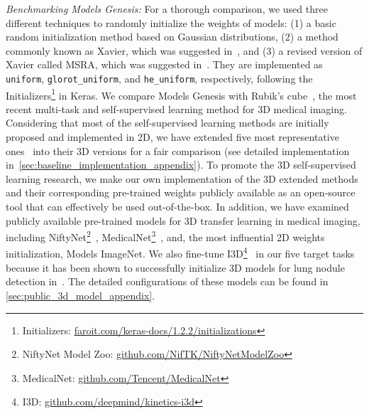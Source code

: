 \textit{Benchmarking Models Genesis:} For a thorough comparison, we used three different techniques to randomly initialize the weights of models: (1) a basic random initialization method based on Gaussian distributions, (2) a method commonly known as Xavier, which was suggested in~\citet{glorot2010understanding}, and (3) a revised version of Xavier called MSRA, which was suggested in~\citet{he2015delving}. They are implemented as \texttt{uniform}, \texttt{glorot\_uniform}, and \texttt{he\_uniform}, respectively, following the Initializers\footnote{\label{foot:Initializer}Initializers: \href{http://faroit.com/keras-docs/1.2.2/initializations/}{faroit.com/keras-docs/1.2.2/initializations}} in Keras. We compare Models Genesis with Rubik's cube~\citep{zhuang2019self}, the most recent multi-task and self-supervised learning method for 3D medical imaging. Considering that most of the self-supervised learning methods are initially proposed and implemented in 2D, we have extended five most representative ones~\citep{vincent2010stacked,pathak2016context,noroozi2016unsupervised,chen2019self,caron2018deep} into their 3D versions for a fair comparison (see detailed implementation in~\ref{sec:baseline_implementation_appendix}). To promote the 3D self-supervised learning research, we make our own implementation of the 3D extended methods and their corresponding pre-trained weights publicly available as an open-source tool that can effectively be used out-of-the-box. In addition, we have examined publicly available pre-trained models for 3D transfer learning in medical imaging, including NiftyNet\footnote{\label{foot:NiftyNet}NiftyNet Model Zoo: \href{https://github.com/NifTK/NiftyNetModelZoo}{github.com/NifTK/NiftyNetModelZoo}}~\citep{gibson2018niftynet}, MedicalNet\footnote{\label{foot:MedicalNet}MedicalNet: \href{https://github.com/Tencent/MedicalNet}{github.com/Tencent/MedicalNet}}~\citep{chen2019med3d}, and, the most influential 2D weights initialization, Models ImageNet. We also fine-tune I3D\footnote{\label{foot:I3D}I3D: \href{https://github.com/deepmind/kinetics-i3d}{github.com/deepmind/kinetics-i3d}}~\citep{carreira2017quo} in our five target tasks because it has been shown to successfully initialize 3D models for lung nodule detection in~\citet{ardila2019end}. The detailed configurations of these models can be found in \ref{sec:public_3d_model_appendix}.

